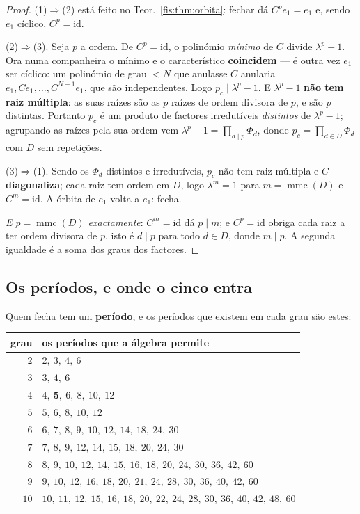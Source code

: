 \documentclass[livro.tex]{subfiles}
\begin{document}
\begin{proof}
(1)$\Rightarrow$(2) está feito no Teor.~\ref{fis:thm:orbita}: fechar dá
$C^{p}e_1=e_1$ e, sendo $e_1$ cíclico, $C^{p}=\mathrm{id}$.

(2)$\Rightarrow$(3). Seja $p$ a ordem. De $C^{p}=\mathrm{id}$, o polinómio
\emph{mínimo} de $C$ divide $\lambda^{p}-1$. Ora numa companheira o mínimo e o
característico \textbf{coincidem} --- é outra vez $e_1$ ser cíclico: um polinómio
de grau $<N$ que anulasse $C$ anularia $e_1,Ce_1,\dots,C^{N-1}e_1$, que são
independentes. Logo $p_c\mid\lambda^{p}-1$. E $\lambda^{p}-1$ \textbf{não tem
raiz múltipla}: as suas raízes são as $p$ raízes de ordem divisora de $p$, e são
$p$ distintas. Portanto $p_c$ é um produto de factores irredutíveis
\emph{distintos} de $\lambda^{p}-1$; agrupando as raízes pela sua ordem vem
$\lambda^{p}-1=\prod_{d\mid p}\Phi_d$, donde $p_c=\prod_{d\in D}\Phi_d$ com $D$
sem repetições.

(3)$\Rightarrow$(1). Sendo os $\Phi_d$ distintos e irredutíveis, $p_c$ não tem
raiz múltipla e $C$ \textbf{diagonaliza}; cada raiz tem ordem em $D$, logo
$\lambda^{m}=1$ para $m=\operatorname{mmc}(D)$ e $C^{m}=\mathrm{id}$. A órbita de
$e_1$ volta a $e_1$: fecha.

\emph{E $p=\operatorname{mmc}(D)$ exactamente}: $C^{m}=\mathrm{id}$ dá $p\mid m$;
e $C^{p}=\mathrm{id}$ obriga cada raiz a ter ordem divisora de $p$, isto é
$d\mid p$ para todo $d\in D$, donde $m\mid p$. A segunda igualdade é a soma dos
graus dos factores.
\end{proof}

\subsection*{Os períodos, e onde o cinco entra}

\noindent Quem fecha tem um \textbf{período}, e os períodos que existem em cada
grau são estes:
\begin{center}\small
\begin{tabular}{@{}rl@{}}
\toprule
grau & os períodos que a álgebra permite \\
\midrule
$2$ & $2,\ 3,\ 4,\ 6$ \\
$3$ & $3,\ 4,\ 6$ \\
$4$ & $4,\ \mathbf{5},\ 6,\ 8,\ 10,\ 12$ \\
$5$ & $5,\ 6,\ 8,\ 10,\ 12$ \\
$6$ & $6,\ 7,\ 8,\ 9,\ 10,\ 12,\ 14,\ 18,\ 24,\ 30$ \\
$7$ & $7,\ 8,\ 9,\ 12,\ 14,\ 15,\ 18,\ 20,\ 24,\ 30$ \\
$8$ & $8,\ 9,\ 10,\ 12,\ 14,\ 15,\ 16,\ 18,\ 20,\ 24,\ 30,\ 36,\ 42,\ 60$ \\
$9$ & $9,\ 10,\ 12,\ 16,\ 18,\ 20,\ 21,\ 24,\ 28,\ 30,\ 36,\ 40,\ 42,\ 60$ \\
$10$ & $10,\ 11,\ 12,\ 15,\ 16,\ 18,\ 20,\ 22,\ 24,\ 28,\ 30,\ 36,\ 40,\ 42,\ 48,\ 60$ \\
\bottomrule
\end{tabular}
\end{center}
\end{document}

